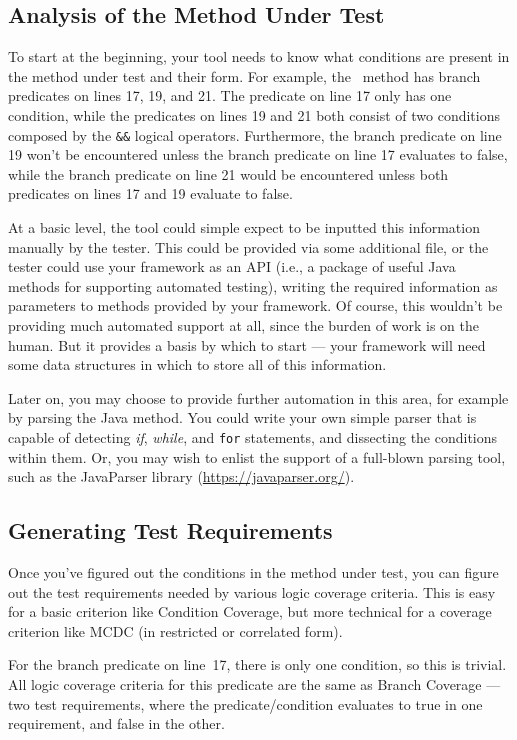 \subsection{Analysis of the Method Under Test}

To start at the beginning, your tool needs to know what conditions are present
in the method under test and their form. For example, the
\calculatemethod~method has branch predicates on lines 17, 19, and 21. The
predicate on line 17 only has one condition, while the predicates on lines 19
and 21 both consist of two conditions composed by the {\tt \&\&} logical
operators. Furthermore, the branch predicate on line 19 won't be encountered
unless the branch predicate on line 17 evaluates to false, while the branch
predicate on line 21 would be encountered unless both predicates on lines 17 and
19 evaluate to false.

At a basic level, the tool could simple expect to be inputted this information
manually by the tester. This could be provided via some additional file, or the
tester could use your framework as an API (i.e., a package of useful Java
methods for supporting automated testing), writing the required information as
parameters to methods provided by your framework. 
%
Of course, this wouldn't be providing much automated support at all, since the
burden of work is on the human. But it provides a basis by which to start ---
your framework will need some data structures in which to store all of this
information. 

Later on, you may choose to provide further automation in this area, for example
by parsing the Java method. You could write your own simple parser that is
capable of detecting {\it if}, {\it while}, and {\tt for} statements, and
dissecting the conditions within them.
%
Or, you may wish to enlist the support of a full-blown parsing tool, such as the
JavaParser library (\url{https://javaparser.org/}).

\subsection{Generating Test Requirements}

Once you've figured out the conditions in the method under test, you can figure
out the test requirements needed by various logic coverage criteria. This is
easy for a basic criterion like Condition Coverage, but more technical for a
coverage criterion like MCDC (in restricted or correlated form). 

For the branch predicate on line~17, there is only one condition, so this is
trivial. All logic coverage criteria for this predicate are the same as Branch
Coverage --- two test requirements, where the predicate/condition evaluates to
true in one requirement, and false in the other.

